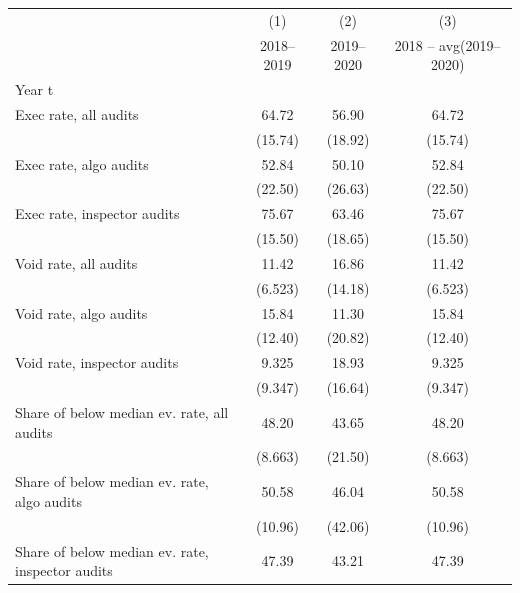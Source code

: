 {
\def\sym#1{\ifmmode^{#1}\else\(^{#1}\)\fi}
\begin{tabular}{l*{3}{c}}
\toprule
            &\multicolumn{1}{c}{(1)}&\multicolumn{1}{c}{(2)}&\multicolumn{1}{c}{(3)}\\
            &\multicolumn{1}{c}{2018–2019}&\multicolumn{1}{c}{2019–2020}&\multicolumn{1}{c}{2018 – avg(2019–2020)}\\
\midrule
Year t      &                     &                     &                     \\
Exec rate, all audits&       64.72         &       56.90         &       64.72         \\
            &     (15.74)         &     (18.92)         &     (15.74)         \\
Exec rate, algo audits&       52.84         &       50.10         &       52.84         \\
            &     (22.50)         &     (26.63)         &     (22.50)         \\
Exec rate, inspector audits&       75.67         &       63.46         &       75.67         \\
            &     (15.50)         &     (18.65)         &     (15.50)         \\
Void rate, all audits&       11.42         &       16.86         &       11.42         \\
            &     (6.523)         &     (14.18)         &     (6.523)         \\
Void rate, algo audits&       15.84         &       11.30         &       15.84         \\
            &     (12.40)         &     (20.82)         &     (12.40)         \\
Void rate, inspector audits&       9.325         &       18.93         &       9.325         \\
            &     (9.347)         &     (16.64)         &     (9.347)         \\
Share of below median ev. rate, all audits&       48.20         &       43.65         &       48.20         \\
            &     (8.663)         &     (21.50)         &     (8.663)         \\
Share of below median ev. rate, algo audits&       50.58         &       46.04         &       50.58         \\
            &     (10.96)         &     (42.06)         &     (10.96)         \\
Share of below median ev. rate, inspector audits&       47.39         &       43.21         &       47.39         \\

\end{tabular}}

